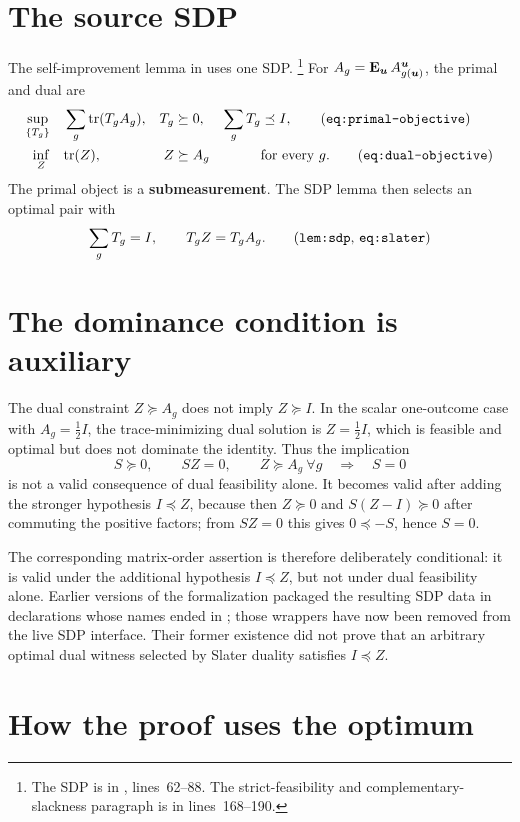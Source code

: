 \documentclass[11pt]{article}
\begin{document}
\section{The source SDP}

The self-improvement lemma in \cite{Ji2020LowIndividualDegree} uses one SDP.%
\footnote{The SDP is in ,
lines~62--88.  The strict-feasibility and complementary-slackness paragraph is
in lines~168--190.}
For $A_g=\mathop{\bf E\/}_{\boldsymbol{u}}A^{\boldsymbol{u}}_{g(\boldsymbol{u})}$, the primal and dual are
\begin{align}
  \sup_{\{T_g\}}&\quad \sum_g\tr(T_gA_g),&
  T_g&\succeq0,& \sum_gT_g&\preceq I,\tag{\texttt{eq:primal-objective}}\\
  \inf_Z&\quad \tr(Z),&
  Z&\succeq A_g&&\text{for every }g.\tag{\texttt{eq:dual-objective}}
\end{align}
The primal object is a \textbf{submeasurement}.  The SDP lemma then selects an
optimal pair with
\[
  \sum_gT_g=I,
  \qquad
  T_gZ=T_gA_g.
  \tag{\texttt{lem:sdp}, \texttt{eq:slater}}
\]

\section{The dominance condition is auxiliary}

The dual constraint $Z\succeq A_g$ does not imply $Z\succeq I$.  In the scalar
one-outcome case with $A_g=\frac12 I$, the trace-minimizing dual solution is
$Z=\frac12 I$, which is feasible and optimal but does not dominate the identity.
Thus the implication
\[
  S\succeq0,\qquad SZ=0,\qquad Z\succeq A_g\ \forall g
  \quad\Longrightarrow\quad S=0
\]
is not a valid consequence of dual feasibility alone.  It becomes valid after
adding the stronger hypothesis $I\preceq Z$, because then $Z\succeq0$ and
$S(Z-I)\succeq0$ after commuting the positive factors; from $SZ=0$ this gives
$0\preceq -S$, hence $S=0$.

The corresponding matrix-order assertion is therefore deliberately conditional:
it is valid under the additional hypothesis $I\preceq Z$, but not under dual
feasibility alone.  Earlier versions of the formalization packaged the
resulting SDP data in declarations whose names ended in ;
those wrappers have now been removed from the live SDP interface.  Their former
existence did not prove that an arbitrary optimal dual witness selected by
Slater duality satisfies $I\preceq Z$.

\section{How the proof uses the optimum}
\end{document}
